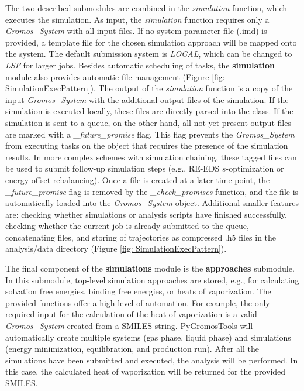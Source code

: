 The two described submodules are combined in the \textit{simulation} function, which executes the simulation. As input, the \textit{simulation} function requires only a \textit{Gromos\_System} with all input files. If no system parameter file (.imd) is provided, a template file for the chosen simulation approach will be mapped onto the system. The default submission system is \textit{LOCAL}, which can be changed to \textit{LSF} for larger jobs. Besides automatic scheduling of tasks, the \textbf{simulation} module also provides automatic file management (Figure \ref{fig: SimulationExecPattern}). The output of the \textit{simulation} function is a copy of the input \textit{Gromos\_System} with the additional output files of the simulation. If the simulation is executed locally, these files are directly parsed into the class. If the simulation is sent to a queue, on the other hand, all not-yet-present output files are marked with a \textit{\_future\_promise} flag. This flag prevents the \textit{Gromos\_System} from executing tasks on the object that requires the presence of the simulation results. In more complex schemes with simulation chaining, these tagged files can be used to submit follow-up simulation steps (e.g., RE-EDS $s$-optimization or energy offset rebalancing\cite{Ries2021B}). Once a file is created at a later time point, the \textit{\_future\_promise} flag is removed by the \textit{\_check\_promises} function, and the file is automatically loaded into the \textit{Gromos\_System} object.
Additional smaller features are: checking whether simulations or analysis scripts have finished successfully, checking whether the current job is already submitted to the queue, concatenating files, and storing of trajectories as compressed .h5 files in the analysis/data directory (Figure \ref{fig: SimulationExecPattern}).

The final component of the \textbf{simulations} module is the \textbf{approaches} submodule. In this submodule, top-level simulation approaches are stored, e.g., for calculating solvation free energies, binding free energies, or heats of vaporization. The provided functions offer a high level of automation. For example, the only required input for the calculation of the heat of vaporization is a valid \textit{Gromos\_System} created from a SMILES string. PyGromosTools will automatically create multiple systems (gas phase, liquid phase) and simulations (energy minimization, equilibration, and production run). After all the simulations have been submitted and executed, the analysis will be performed. In this case, the calculated heat of vaporization will be returned for the provided SMILES.


